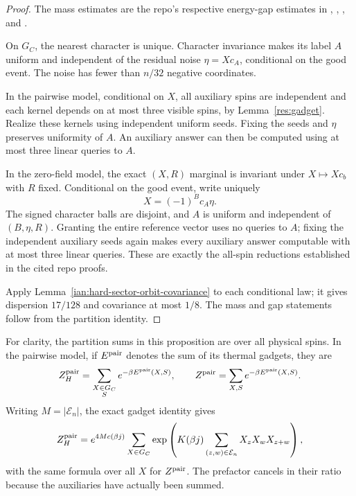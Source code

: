 \begin{proof}
The mass estimates are the repo's respective energy-gap estimates in
,
,
, and
.

On \(G_C\), the nearest character is unique. Character invariance
makes its label \(A\) uniform and independent of the residual noise
\(\eta=Xc_A\), conditional on the good event. The noise has fewer than
\(n/32\) negative coordinates.

In the pairwise model, conditional on \(X\), all auxiliary spins are
independent and each kernel depends on at most three visible spins,
by Lemma~\ref{res:gadget}. Realize these kernels using independent
uniform seeds. Fixing the seeds and \(\eta\) preserves uniformity of
\(A\). An auxiliary answer can then be computed using at most three
linear queries to \(A\).

In the zero-field model, the exact \((X,R)\) marginal is invariant
under \(X\mapsto Xc_b\) with \(R\) fixed. Conditional on the good
event, write uniquely
\[
 X=(-1)^Bc_A\eta.
\]
The signed character balls are disjoint, and \(A\) is uniform and
independent of \((B,\eta,R)\). Granting the entire reference vector
uses no queries to \(A\); fixing the independent auxiliary seeds
again makes every auxiliary answer computable with at most three
linear queries. These are exactly the all-spin reductions established
in the cited repo proofs.

Apply Lemma~\ref{ian:hard-sector-orbit-covariance} to each conditional
law; it gives dispersion \(17/128\) and covariance at most \(1/8\).
The mass and gap statements follow from the partition identity.
\end{proof}

For clarity, the partition sums in this proposition are over all
physical spins. In the pairwise model, if \(E^{\rm pair}\) denotes
the sum of its thermal gadgets, they are
\[
 Z_H^{\rm pair}
 =\sum_{\substack{X\in G_C\\S}}e^{-\beta E^{\rm pair}(X,S)},
 \qquad
 Z^{\rm pair}=\sum_{X,S}e^{-\beta E^{\rm pair}(X,S)}.
\]
Writing \(M=|\mathcal E_n|\), the exact gadget identity gives
\[
 Z_H^{\rm pair}
 =e^{4Mc(\beta j)}
 \sum_{X\in G_C}
 \exp\left(K(\beta j)\sum_{(z,w)\in\mathcal E_n}
 X_zX_wX_{z+w}\right),
\]
with the same formula over all \(X\) for \(Z^{\rm pair}\).
The prefactor cancels in their ratio because the auxiliaries have
actually been summed.

